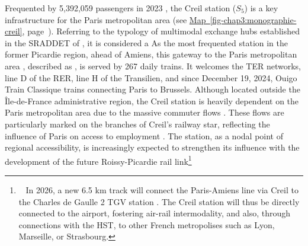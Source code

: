 \begin{refsegment}
Frequented by 5,392,059 passengers in 2023 \textcolor{blue}{\textcite{sncf_frequentation_2024}}, the Creil station (\(S_5\)) is a key infrastructure for the Paris metropolitan area (see \hyperref[fig-chap3:monographie-creil]{Map~\ref{fig-chap3:monographie-creil}}, page~\pageref{fig-chap3:monographie-creil}). Referring to the typology of multimodal exchange hubs established in the \acrshort{SRADDET} of \textcolor{blue}{\textcite[82]{region_hauts-de-france_sraddet_2024}}, it is considered a  As the most frequented station in the former Picardie region, ahead of Amiens, this gateway to the Paris metropolitan area \textcolor{blue}{\autocite[166]{lo_feudo_scenario_2014}}, described as  \textcolor{blue}{\textcite[6]{conseil_regional_de_picardie_gare_2010}}, is served by 267 daily trains. It welcomes the \acrshort{TER} networks, line D of the \acrshort{RER}, line H of the Transilien, and since December 19, 2024, Ouigo Train Classique trains connecting Paris to Brussels. Although located outside the Île-de-France administrative region, the Creil station is heavily dependent on the Paris metropolitan area due to the massive commuter flows \textcolor{blue}{\autocite[19]{block_novel_2024}}. These flows are particularly marked on the branches of Creil’s railway star, reflecting the influence of Paris on access to employment \textcolor{blue}{\autocite[24]{cete_nord_picardie_pour_2011}}. The station, as a nodal point of regional accessibility, is increasingly expected to strengthen its influence with the development of the future Roissy-Picardie rail link\footnote{~
    In 2026, a new 6.5 km track will connect the Paris-Amiens line via Creil to the Charles de Gaulle 2 TGV station \textcolor{blue}{\autocite{mateos_nouvelle_2024}}. The Creil station will thus be directly connected to the airport, fostering air-rail intermodality, and also, through connections with the \acrshort{HST}, to other French metropolises such as Lyon, Marseille, or Strasbourg.
}
\end{refsegment}
